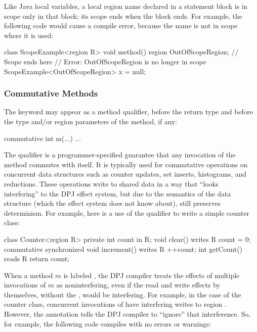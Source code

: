 Like Java local variables, a local region name declared in a statement
block is in scope only in that block; its scope ends when the block
ends.  For example, the following code would cause a compile error,
because the name  is not in scope where it is
used:
%
\begin{dpjlisting}
class ScopeExample<region R> {
    void method() {
        {
            region OutOfScopeRegion;
            // Scope ends here
        }
        // Error:  OutOfScopeRegion is no longer in scope
        ScopeExample<OutOfScopeRegion> x = null;
    }
}
\end{dpjlisting}

\subsubsection{Commutative Methods%
\label{sec:classes:methods:commutative}}

The keyword  may appear as a method qualifier, before
the return type and before the type and/or region parameters of the
method, if any:

\begin{dpjlisting}
commutative int m(...) { ... }
\end{dpjlisting}

The  qualifier is a programmer-specified guarantee
that any invocation of the method commutes with itself.  It is
typically used for commutative operations on concurrent data
structures such as counter updates, set inserts, histograms, and
reductions.  These operations write to shared data in a way that
``looks interfering'' to the DPJ effect system, but due to the
semantics of the data structure (which the effect system does not know
about), still preserves determinism.  For example, here is a use of
the  qualifier to write a simple counter class:

\begin{dpjlisting}
class Counter<region R> {
  private int count in R;
  void clear() writes R { count = 0; }
  commutative synchronized void increment() writes R {
    ++count;
  }
  int getCount() reads R { return count; }
}
\end{dpjlisting}

When a method $m$ is labeled , the DPJ compiler
treats the effects of multiple invocations of $m$ as noninterfering,
even if the read and write effects by themselves, without the
, would be interfering.  For example, in the case of
the counter class, concurrent invocations of  have
interfering writes to region .  However, the 
annotation tells the DPJ compiler to ``ignore'' that interference.
So, for example, the following code compiles with no errors or
warnings:

